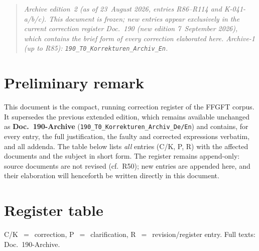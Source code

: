 
\begin{quote}\itshape
Archive edition~2 (as of 23~August 2026, entries R86--R114 and K-041-a/b/c).
This document is frozen; new entries appear exclusively in the current
correction register Doc.~190 (new edition 7~September 2026),
which contains the brief form of every correction elaborated here.
Archive-1 (up to R85): \texttt{190\_T0\_Korrekturen\_Archiv\_En}.
\end{quote}

\medskip

\providecommand{\QM}{\textbf{[Q]}}
\section*{Preliminary remark}

This document is the compact, running correction register of the FFGFT corpus. It supersedes the previous extended edition, which remains available unchanged as \textbf{Doc.~190-Archive} (\texttt{190\_T0\_Korrekturen\_Archiv\_De/En}) and contains, for every entry, the full justification, the faulty and corrected expressions verbatim, and all addenda. The table below lists \emph{all} entries (C/K, P, R) with the affected documents and the subject in short form. The register remains append-only: source documents are not revised (cf.\ R50); new entries are appended here, and their elaboration will henceforth be written directly in this document.

\section{Register table}

\noindent C/K~$=$~correction, P~$=$~clarification, R~$=$~revision/register entry. Full texts: Doc.~190-Archive.

